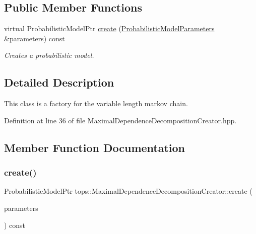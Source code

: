 \subsection*{Public Member Functions}
\begin{DoxyCompactItemize}
\item 
virtual Probabilistic\+Model\+Ptr \hyperlink{classtops_1_1MaximalDependenceDecompositionCreator_a9d90148ccc1e27acc090f549d7c442af}{create} (\hyperlink{classtops_1_1ProbabilisticModelParameters}{Probabilistic\+Model\+Parameters} \&parameters) const
\begin{DoxyCompactList}\small\item\em Creates a probabilistic model. \end{DoxyCompactList}\end{DoxyCompactItemize}


\subsection{Detailed Description}
This class is a factory for the variable length markov chain. 

Definition at line 36 of file Maximal\+Dependence\+Decomposition\+Creator.\+hpp.



\subsection{Member Function Documentation}
\mbox{\label{classtops_1_1MaximalDependenceDecompositionCreator_a9d90148ccc1e27acc090f549d7c442af}} 
\subsubsection{\texorpdfstring{create()}{create()}}
{\footnotesize\ttfamily Probabilistic\+Model\+Ptr tops\+::\+Maximal\+Dependence\+Decomposition\+Creator\+::create (\begin{DoxyParamCaption}\item[{\hyperlink{classtops_1_1ProbabilisticModelParameters}{Probabilistic\+Model\+Parameters} \&}]{parameters }\end{DoxyParamCaption}) const\hspace{0.3cm}{\ttfamily [virtual]}}



